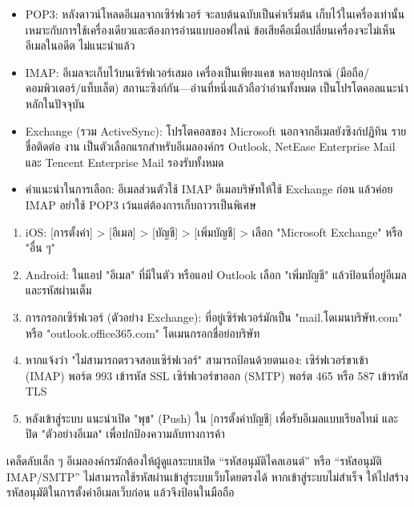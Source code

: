 
\begin{itemize}
  \item POP3: หลังดาวน์โหลดอีเมลจากเซิร์ฟเวอร์ จะลบต้นฉบับเป็นค่าเริ่มต้น เก็บไว้ในเครื่องเท่านั้น เหมาะกับการใช้เครื่องเดียวและต้องการอ่านแบบออฟไลน์ ข้อเสียคือเมื่อเปลี่ยนเครื่องจะไม่เห็นอีเมลในอดีต ไม่แนะนำแล้ว
  \item IMAP: อีเมลจะเก็บไว้บนเซิร์ฟเวอร์เสมอ เครื่องเป็นเพียงแคช หลายอุปกรณ์ (มือถือ/คอมพิวเตอร์/แท็บเล็ต) สถานะซิงก์กัน—อ่านที่หนึ่งแล้วถือว่าอ่านทั้งหมด เป็นโปรโตคอลแนะนำหลักในปัจจุบัน
  \item Exchange (รวม ActiveSync): โปรโตคอลของ Microsoft นอกจากอีเมลยังซิงก์ปฏิทิน รายชื่อติดต่อ งาน เป็นตัวเลือกแรกสำหรับอีเมลองค์กร Outlook, NetEase Enterprise Mail และ Tencent Enterprise Mail รองรับทั้งหมด
  \item คำแนะนำในการเลือก: อีเมลส่วนตัวใช้ IMAP อีเมลบริษัทให้ใช้ Exchange ก่อน แล้วค่อย IMAP อย่าใช้ POP3 เว้นแต่ต้องการเก็บถาวรเป็นพิเศษ
\end{itemize}


\begin{enumerate}
  \item iOS: [การตั้งค่า] > [อีเมล] > [บัญชี] > [เพิ่มบัญชี] > เลือก "Microsoft Exchange" หรือ "อื่น ๆ"
  \item Android: ในแอป "อีเมล" ที่มีในตัว หรือแอป Outlook เลือก "เพิ่มบัญชี" แล้วป้อนที่อยู่อีเมลและรหัสผ่านเต็ม
  \item การกรอกเซิร์ฟเวอร์ (ตัวอย่าง Exchange): ที่อยู่เซิร์ฟเวอร์มักเป็น "mail.โดเมนบริษัท.com" หรือ "outlook.office365.com" โดเมนกรอกชื่อย่อบริษัท
  \item หากแจ้งว่า "ไม่สามารถตรวจสอบเซิร์ฟเวอร์" สามารถป้อนด้วยตนเอง: เซิร์ฟเวอร์ขาเข้า (IMAP) พอร์ต 993 เข้ารหัส SSL เซิร์ฟเวอร์ขาออก (SMTP) พอร์ต 465 หรือ 587 เข้ารหัส TLS
  \item หลังเข้าสู่ระบบ แนะนำเปิด "พุช" (Push) ใน [การตั้งค่าบัญชี] เพื่อรับอีเมลแบบเรียลไทม์ และปิด "ตัวอย่างอีเมล" เพื่อปกป้องความลับทางการค้า
\end{enumerate}

\begin{tcbinfo}{เคล็ดลับเล็ก ๆ}
อีเมลองค์กรมักต้องให้ผู้ดูแลระบบเปิด “รหัสอนุมัติไคลเอนต์” หรือ “รหัสอนุมัติ IMAP/SMTP” ไม่สามารถใช้รหัสผ่านเข้าสู่ระบบเว็บโดยตรงได้ หากเข้าสู่ระบบไม่สำเร็จ ให้ไปสร้างรหัสอนุมัติในการตั้งค่าอีเมลเว็บก่อน แล้วจึงป้อนในมือถือ

\end{tcbinfo}

